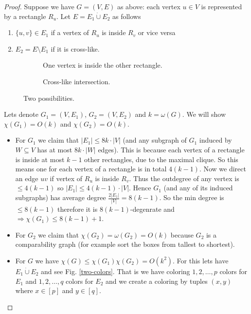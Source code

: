 \begin{proof}
	Suppose we have $G = (V,E)$ as above: each vertex $u \in V$ is represented by a rectangle $R_u$. Let $E = E_1 \dot{\cup} E_2$ as follows
	
	\begin{enumerate}
		\item $\{u,v\} \in E_1$ if a vertex of $R_u$ is inside $R_v$ or vice versa
		\item $E_2 = E \setminus E_1$ if it is cross-like.
	\end{enumerate}
	
	\begin{figure}[!ht]\centering
		\begin{subfigure}{.45\textwidth}\centering
			\caption{One vertex is inside the other rectangle.}
			\label{inter-box}
		\end{subfigure}
		\begin{subfigure}{.45\textwidth}\centering
			\caption{Cross-like intersection.}
		\end{subfigure}
		\caption{Two possibilities.}
	\end{figure}
	
	Lets denote $G_1 = (V, E_1)$, $G_2 = (V, E_2)$ and $k = \omega(G)$. We will show $\chi(G_1) = O(k)$ and $\chi(G_2) = O(k)$.
	
	\begin{itemize}
		\item For $G_1$ we claim that $|E_1| \leq 8 k \cdot |V|$ (and any subgraph of $G_1$ induced by $W \subseteq V$ has at most $8 k \cdot |W|$ edges). This is because each vertex of a rectangle is inside at most $k-1$ other rectangles, due to the maximal clique. So this means one for each vertex of a rectangle is in total $4 (k-1)$. Now we direct an edge $uv$ if vertex of $R_u$ is inside $R_v$. Thus the outdegree of any vertex is $\leq 4 (k-1)$ so $|E_1| \leq 4 (k-1) \cdot |V|$. Hence $G_1$ (and any of its induced subgraphs) has average degree $\frac{2 |E_1|}{|V|} = 8 (k-1)$. So the min degree is $\leq 8 (k-1)$ therefore it is $8(k-1)$-degenrate and $\Rightarrow \chi(G_1) \leq 8 (k-1) + 1$.
		\item For $G_2$ we claim that $\chi(G_2) = \omega(G_2) = O(k)$ because $G_2$ is a comparability graph (for example sort the boxes from tallest to shortest).
		\item For $G$ we have $\chi(G) \leq \chi(G_1) \chi(G_2) = O(k^2)$. For this lets have $E_1 \dot{\cup} E_2$ and see Fig. \ref{two-colors}. That is we have coloring $1,2, \dots, p$ colors for $E_1$ and $1,2, \dots, q$ colors for $E_2$ and we create a coloring by tuples $(x,y)$ where $x \in [p]$ and $y \in [q]$.
	\end{itemize}
	

\end{proof}
